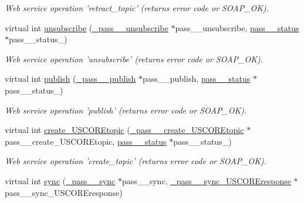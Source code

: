 \begin{DoxyCompactItemize}
\begin{DoxyCompactList}\small\item\em Web service operation 'retract\_\-topic' (returns error code or SOAP\_\-OK). \item\end{DoxyCompactList}\item 
\hypertarget{classPASSPortBindingProxy_ab53503244230c52f38d809cb6a3f99ab}{
virtual int \hyperlink{classPASSPortBindingProxy_ab53503244230c52f38d809cb6a3f99ab}{unsubscribe} (\hyperlink{class__pass____unsubscribe}{\_\-pass\_\-\_\-unsubscribe} $\ast$pass\_\-\_\-unsubscribe, \hyperlink{classpass____status}{pass\_\-\_\-status} $\ast$pass\_\-\_\-status\_\-)}
\label{classPASSPortBindingProxy_ab53503244230c52f38d809cb6a3f99ab}

\begin{DoxyCompactList}\small\item\em Web service operation 'unsubscribe' (returns error code or SOAP\_\-OK). \item\end{DoxyCompactList}\item 
\hypertarget{classPASSPortBindingProxy_a20d758e2164f2b708555fdd4d078b700}{
virtual int \hyperlink{classPASSPortBindingProxy_a20d758e2164f2b708555fdd4d078b700}{publish} (\hyperlink{class__pass____publish}{\_\-pass\_\-\_\-publish} $\ast$pass\_\-\_\-publish, \hyperlink{classpass____status}{pass\_\-\_\-status} $\ast$pass\_\-\_\-status\_\-)}
\label{classPASSPortBindingProxy_a20d758e2164f2b708555fdd4d078b700}

\begin{DoxyCompactList}\small\item\em Web service operation 'publish' (returns error code or SOAP\_\-OK). \item\end{DoxyCompactList}\item 
\hypertarget{classPASSPortBindingProxy_a80019eceaa6bfd50439c75891e010947}{
virtual int \hyperlink{classPASSPortBindingProxy_a80019eceaa6bfd50439c75891e010947}{create\_\-USCOREtopic} (\hyperlink{class__pass____create__USCOREtopic}{\_\-pass\_\-\_\-create\_\-USCOREtopic} $\ast$pass\_\-\_\-create\_\-USCOREtopic, \hyperlink{classpass____status}{pass\_\-\_\-status} $\ast$pass\_\-\_\-status\_\-)}
\label{classPASSPortBindingProxy_a80019eceaa6bfd50439c75891e010947}

\begin{DoxyCompactList}\small\item\em Web service operation 'create\_\-topic' (returns error code or SOAP\_\-OK). \item\end{DoxyCompactList}\item 
\hypertarget{classPASSPortBindingProxy_ab00705b516b89d923a98299e74eb6bcd}{
virtual int \hyperlink{classPASSPortBindingProxy_ab00705b516b89d923a98299e74eb6bcd}{sync} (\hyperlink{class__pass____sync}{\_\-pass\_\-\_\-sync} $\ast$pass\_\-\_\-sync, \hyperlink{class__pass____sync__USCOREresponse}{\_\-pass\_\-\_\-sync\_\-USCOREresponse} $\ast$pass\_\-\_\-sync\_\-USCOREresponse)}
\label{classPASSPortBindingProxy_ab00705b516b89d923a98299e74eb6bcd}


\end{DoxyCompactItemize}
